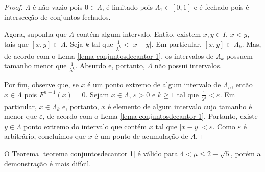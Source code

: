 \begin{proof}
$\Lambda$ é não vazio pois $0 \in \Lambda$, é limitado pois $\Lambda_1 \in [0, 1]$ e é fechado pois é intersecção de conjuntos fechados.

Agora, suponha que $\Lambda$ contém algum intervalo. Então, existem $x, y \in I$, $x < y$, tais que $[x, y] \subset \Lambda$. Seja $k$ tal que $\frac{1}{\lambda^k} < |x - y|$. Em particular, $[x, y] \subset \Lambda_k$. Mas, de acordo com o Lema \ref{lema conjuntosdecantor 1}, os intervalos de $\Lambda_k$ possuem tamanho menor que $\frac{1}{\lambda^k}$. Absurdo e, portanto, $\Lambda$ não possui intervalos.

Por fim, observe que, se $x$ é um ponto extremo de algum intervalo de $\Lambda_n$, então $x \in \Lambda$ pois $F^{n+1}(x) = 0$. Sejam $x \in \Lambda$, $\varepsilon > 0$ e $k \geq 1$ tal que $\frac{1}{\lambda^k} < \varepsilon$. Em particular, $x \in \Lambda_k$ e, portanto, $x$ é elemento de algum intervalo cujo tamanho é menor que $\varepsilon$, de acordo com o Lema \ref{lema conjuntosdecantor 1}. Portanto, existe $y \in \Lambda$ ponto extremo do intervalo que contém $x$ tal que $|x - y| < \varepsilon$. Como $\varepsilon$ é arbitrário, concluímos que $x$ é um ponto de acumulação de $\Lambda$.
\end{proof}

\begin{remark}
O Teorema \ref{teorema conjuntosdecantor 1} é válido para $4 < \mu \leq 2 + \sqrt{5}$, porém a demonstração é mais difícil.
\end{remark}